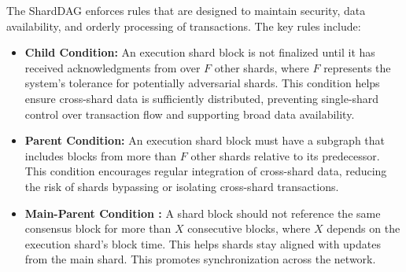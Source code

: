 The ShardDAG enforces rules that  are designed to maintain security, data
availability, and orderly processing of transactions. The key rules
include:

\begin{itemize}
	\item \textbf{Child Condition:} An execution shard block is not
	      finalized until it has received acknowledgments from over
	      $F$ other
	      shards, where $F$ represents the system's tolerance for
	      potentially
	      adversarial shards. This condition helps ensure cross-shard
	      data is
	      sufficiently distributed, preventing single-shard control
	      over transaction
	      flow and supporting broad data availability.

	\item \textbf{Parent Condition:} An execution shard block must
	      have a subgraph that includes blocks from more than $F$
	      other shards
	      relative to its predecessor. This condition encourages
	      regular integration
	      of cross-shard data, reducing the risk of shards bypassing
	      or isolating
	      cross-shard transactions.

	\item \textbf{Main-Parent Condition  :} A shard block should not
	      reference the same consensus block
	      for more than $X$ consecutive blocks, where $X$ depends on
	      the execution
	      shard's block time. This helps shards stay aligned with
	      updates from the
	      main shard. This promotes synchronization across the
	      network.
\end{itemize}

